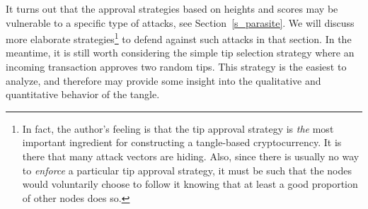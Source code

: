 \documentclass[12pt]{article}
\begin{document}
\begin{CJK}{UTF8}{bkai}
% 
% 

It turns out that the approval strategies based
on heights and scores may be vulnerable to a specific
type of attacks, see Section~\ref{s_parasite}. We will
discuss more elaborate strategies\footnote{In fact, 
the author's feeling is that the tip approval 
strategy is \emph{the} most important ingredient for 
constructing a tangle-based cryptocurrency. It is there that many
attack vectors are hiding. Also, since there is usually no way to 
\emph{enforce} a particular tip approval strategy, it must 
be such that the nodes would voluntarily choose to follow it
knowing that at least a good proportion of other nodes does so.} 
to defend against such attacks
in that section. 
In the meantime, it is still worth considering
the simple tip selection strategy where an incoming 
transaction approves two random tips. 
This strategy 
is the easiest to analyze, and therefore may 
provide some 
insight into the qualitative and quantitative behavior of the 
tangle.


\end{CJK}
\end{document}

